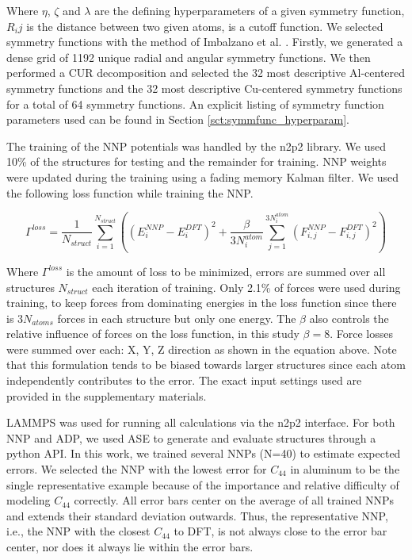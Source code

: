 \documentclass{article}
\begin{document}
Where $\eta$, $\zeta$ and $\lambda$ are the defining hyperparameters of a given symmetry function, $R_ij$ is the distance between two given atoms, is a cutoff function. 
We selected symmetry functions with the method of Imbalzano et al. \cite{Imbalzano2018}.
Firstly, we generated a dense grid of 1192 unique radial and angular symmetry functions.
We then performed a CUR decomposition and selected the 32 most descriptive Al-centered symmetry functions and the 32 most descriptive Cu-centered symmetry functions for a total of 64 symmetry functions. 
An explicit listing of symmetry function parameters used can be found in Section \ref{sct:symmfunc_hyperparam}.

The training of the NNP potentials was handled by the n2p2 library\cite{Singraber2019ParallelPotentials}\cite{Singraber2019Library-BasedPotentials}.
We used 10\% of the structures for testing and the remainder for training.
NNP weights were updated during the training using a fading memory Kalman filter.
We used the following loss function while training the NNP.

\begin{equation}
\Gamma^{loss} = \frac{1}{N_{struct}} \sum^{N_{struct}}_{i=1}((E^{NNP}_i-E^{DFT}_i)^2+\frac{\beta}{3N^{atom}_i}\sum^{3N^{atom}_{i}}_{j=1}(F^{NNP}_{i,j}-F^{DFT}_{i,j})^2)
\end{equation}

Where $\Gamma^{loss}$ is the amount of loss to be minimized, errors are summed over all structures $N_{struct}$ each iteration of training. 
Only 2.1\% of forces were used during training, to keep forces from dominating energies in the loss function since there is $3N_{atoms}$ forces in each structure but only one energy. 
The $\beta$ also controls the relative influence of forces on the loss function, in this study $\beta = 8$.
Force losses were summed over each: X, Y, Z direction as shown in the equation above. 
Note that this formulation tends to be biased towards larger structures since each atom independently contributes to the error. 
The exact input settings used are provided in the supplementary materials.

LAMMPS\cite{Plimpton1995} was used for running all calculations via the n2p2 interface. 
For both NNP and ADP, we used ASE\cite{HjorthLarsen2017} to generate and evaluate structures through a python API. 
In this work, we trained several NNPs (N=40) to estimate expected errors.
We selected the NNP with the lowest error for $C_{44}$ in aluminum to be the single representative example because of the importance and relative difficulty of modeling $C_{44}$ correctly.
All error bars center on the average of all trained NNPs and extends their standard deviation outwards.
Thus, the representative NNP, i.e., the NNP with the closest $C_{44}$ to DFT, is not always close to the error bar center, nor does it always lie within the error bars. 
\end{document}
